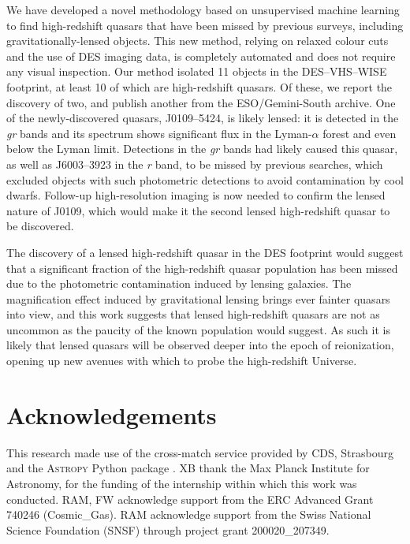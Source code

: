 \documentclass[fleqn,usenatbib]{mnras}
\begin{document}
We have developed a novel methodology based on unsupervised machine learning to find high-redshift quasars that have been missed by previous surveys, including gravitationally-lensed objects.
This new method, relying on relaxed colour cuts and the use of DES imaging data, is completely automated and does not require any visual inspection.
Our method isolated 11 objects in the DES--VHS--WISE footprint, at least 10 of which are high-redshift quasars.
Of these, we report the discovery of two, and publish another from the ESO/Gemini-South archive.
One of the newly-discovered quasars, J0109--5424, is likely lensed: it is detected in the \textit{gr} bands and its spectrum shows significant flux in the Lyman-$\alpha$ forest and even below the Lyman limit.
Detections in the \textit{gr} bands had likely caused this quasar, as well as J6003--3923 in the \textit{r} band, to be missed by previous searches, which excluded objects with such photometric detections to avoid contamination by cool dwarfs.
Follow-up high-resolution imaging is now needed to confirm the lensed nature of J0109, which would make it the second lensed high-redshift quasar to be discovered.

The discovery of a lensed high-redshift quasar in the DES footprint would suggest that a significant fraction of the high-redshift quasar population has been missed due to the photometric contamination induced by lensing galaxies.
The magnification effect induced by gravitational lensing brings ever fainter quasars into view, and this work suggests that lensed high-redshift quasars are not as uncommon as the paucity of the known population would suggest.
As such it is likely that lensed quasars will be observed deeper into the epoch of reionization, opening up new avenues with which to probe the high-redshift Universe.


\section*{Acknowledgements}

This research made use of the cross-match service provided by CDS, Strasbourg \citep{boch12} and the \textsc{Astropy} Python package \citep{astropy1, astropy2, astropy3}.
XB thank the Max Planck Institute for Astronomy, for the funding of the internship within which this work was conducted. RAM, FW acknowledge support from the ERC Advanced Grant 740246 (Cosmic\_Gas). RAM acknowledge support from the Swiss National Science Foundation (SNSF) through project grant 200020\_207349.
\end{document}
